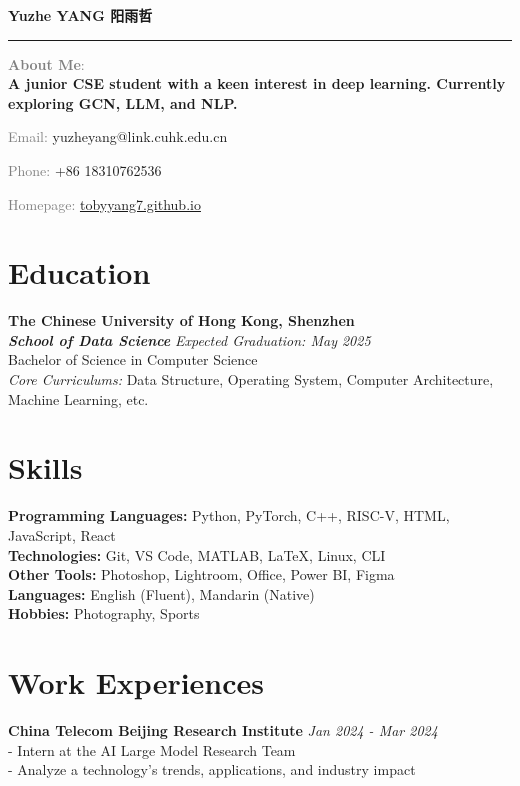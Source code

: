 \documentclass[a4paper,10pt]{article}
\newcommand{\name}[1]{\noindent\textbf{\LARGE #1}\vspace{0.5em}\hrule\vspace{1em}}
\newcommand{\contact}[2]{\noindent\textcolor{gray}{#1:} #2\par}
\begin{document}
\name{Yuzhe YANG 阳雨哲}

\contact{\textbf{About Me}}{\textbf{\\A junior CSE student with a keen interest in deep learning. Currently exploring GCN, LLM, and NLP.}}
\contact{Email}{yuzheyang@link.cuhk.edu.cn}
\contact{Phone}{+86 18310762536}
\contact{Homepage}{\href{https://tobyyang7.github.io/}{tobyyang7.github.io}}

\section*{Education}
\textbf{The Chinese University of Hong Kong, Shenzhen\\ \textit{School of Data Science}} \hfill \textit{Expected Graduation: May 2025}\\
Bachelor of Science in Computer Science\\
\textit{Core Curriculums:} Data Structure, Operating System, Computer Architecture, Machine Learning, etc.


\section*{Skills}
\textbf{Programming Languages:} Python, PyTorch, C++, RISC-V, HTML, JavaScript, React\\
\textbf{Technologies:} Git, VS Code, MATLAB, \LaTeX, Linux, CLI\\
\textbf{Other Tools:} Photoshop, Lightroom, Office, Power BI, Figma\\
\textbf{Languages:} English (Fluent), Mandarin (Native)\\
\textbf{Hobbies:} Photography, Sports

\section*{Work Experiences}
\textbf{China Telecom Beijing Research Institute} \hfill \textit{Jan 2024 - Mar 2024}\\
- Intern at the AI Large Model Research Team\\
- Analyze a technology's trends, applications, and industry impact
\end{document}
